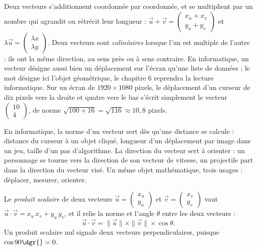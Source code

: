 Deux vecteurs s'additionnent coordonnée par coordonnée, et se multiplient par un nombre qui agrandit ou rétrécit leur longueur : $\vec{u} + \vec{v} = \begin{pmatrix} x_u + x_v \\ y_u + y_v \end{pmatrix}$ et $\lambda \vec{u} = \begin{pmatrix} \lambda x \\ \lambda y \end{pmatrix}$. Deux vecteurs sont \emph{colinéaires} lorsque l'un est multiple de l'autre : ils ont la même direction, au sens près ou à sens contraire. En informatique, un vecteur désigne aussi bien un déplacement sur l'écran qu'une liste de données ; le mot désigne ici l'objet géométrique, le chapitre 6 reprendra la lecture informatique. Sur un écran de $1920 \times 1080$ pixels, le déplacement d'un curseur de dix pixels vers la droite et quatre vers le bas s'écrit simplement le vecteur $\begin{pmatrix} 10 \\ 4 \end{pmatrix}$, de norme $\sqrt{100 + 16} = \sqrt{116} \approx 10{,}8$ pixels.

En informatique, la norme d'un vecteur sert dès qu'une distance se calcule : distance du curseur à un objet cliqué, longueur d'un déplacement par image dans un jeu, taille d'un pas d'algorithme. La direction du vecteur sert à orienter : un personnage se tourne vers la direction de son vecteur de vitesse, un projectile part dans la direction du vecteur visé. Un même objet mathématique, trois usages : déplacer, mesurer, orienter.

\begin{propriete}
Le \emph{produit scalaire} de deux vecteurs $\vec{u} = \begin{pmatrix} x_u \\ y_u \end{pmatrix}$ et $\vec{v} = \begin{pmatrix} x_v \\ y_v \end{pmatrix}$ vaut $\vec{u} \cdot \vec{v} = x_u\,x_v + y_u\,y_v$, et il relie la norme et l'angle $\theta$ entre les deux vecteurs :
\[
\vec{u} \cdot \vec{v} = \|\vec{u}\| \times \|\vec{v}\| \times \cos \theta .
\]
Un produit scalaire nul signale deux vecteurs perpendiculaires, puisque $\cos 90\dgr{} = 0$.
\end{propriete}

